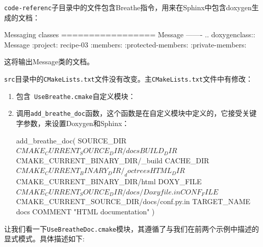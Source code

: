 \texttt{code-referenc}子目录中的文件包含Breathe指令，用来在Sphinx中包含doxygen生成的文档：

\begin{codebox}[text]
Messaging classes
=================
Message
-------
..  doxygenclass:: Message
    :project: recipe-03
    :members:
    :protected-members:
    :private-members:
\end{codebox}

这将输出Message类的文档。


\texttt{src}目录中的\texttt{CMakeLists.txt}文件没有改变。主\texttt{CMakeLists.txt}文件中有修改：

\begin{enumerate}
\item 包含\texttt{ UseBreathe.cmake}自定义模块：


\item 调用\texttt{add\_breathe\_doc}函数，这个函数是在自定义模块中定义的，它接受关键字参数，来设置Doxygen和Sphinx：

\begin{codebox}[cmake]
add_breathe_doc(
  SOURCE_DIR
    ${CMAKE_CURRENT_SOURCE_DIR}/docs
  BUILD_DIR
    ${CMAKE_CURRENT_BINARY_DIR}/_build
  CACHE_DIR
    ${CMAKE_CURRENT_BINARY_DIR}/_doctrees
  HTML_DIR
    ${CMAKE_CURRENT_BINARY_DIR}/html
  DOXY_FILE
    ${CMAKE_CURRENT_SOURCE_DIR}/docs/Doxyfile.in
  CONF_FILE
    ${CMAKE_CURRENT_SOURCE_DIR}/docs/conf.py.in
  TARGET_NAME
    docs
  COMMENT
    "HTML documentation"
  )
\end{codebox}

\end{enumerate}

让我们看一下\texttt{UseBreatheDoc.cmake}模块，其遵循了与我们在前两个示例中描述的显式模式。具体描述如下:

